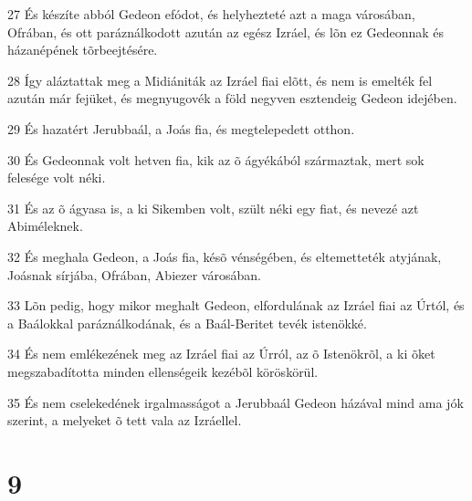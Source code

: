 \par 27 És készíte abból Gedeon efódot, és helyhezteté azt a maga városában, Ofrában, és ott paráználkodott azután az egész Izráel, és lõn ez Gedeonnak és házanépének tõrbeejtésére.
\par 28 Így aláztattak meg a Midiániták az Izráel fiai elõtt, és nem is emelték fel azután már fejüket, és megnyugovék a föld negyven esztendeig Gedeon idejében.
\par 29 És hazatért Jerubbaál, a Joás fia, és megtelepedett otthon.
\par 30 És Gedeonnak volt hetven fia, kik az õ ágyékából származtak, mert sok felesége volt néki.
\par 31 És az õ ágyasa is, a ki Sikemben volt, szült néki egy fiat, és nevezé azt Abiméleknek.
\par 32 És meghala Gedeon, a Joás fia, késõ vénségében, és eltemetteték atyjának, Joásnak sírjába, Ofrában, Abiezer városában.
\par 33 Lõn pedig, hogy mikor meghalt Gedeon, elfordulának az Izráel fiai az Úrtól, és a Baálokkal paráználkodának, és a Baál-Beritet tevék istenökké.
\par 34 És nem emlékezének meg az Izráel fiai az Úrról, az õ Istenökrõl, a ki õket megszabadította minden ellenségeik kezébõl köröskörül.
\par 35 És nem cselekedének irgalmasságot a Jerubbaál Gedeon házával mind ama jók szerint, a melyeket õ tett vala az Izráellel.

\chapter{9}

